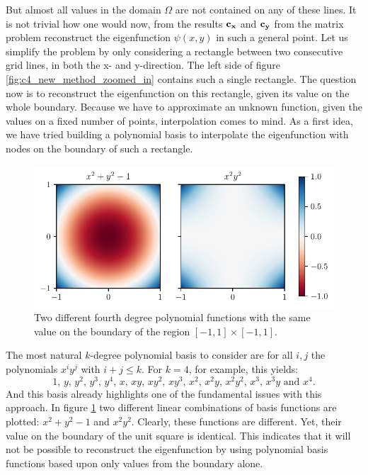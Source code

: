 But almost all values in the domain $\Omega$ are not contained on any of these lines. It is not trivial how one would now, from the results $\vb{c_x}$ and $\vb{c_y}$ from the matrix problem reconstruct the eigenfunction $\psi(x, y)$ in such a general point. Let us simplify the problem by only considering a rectangle between two consecutive grid lines, in both the x- and y-direction. The left side of figure \ref{fig:c4_new_method_zoomed_in} contains such a single rectangle. The question now is to reconstruct the eigenfunction on this rectangle, given its value on the whole boundary. Because we have to approximate an unknown function, given the values on a fixed number of points, interpolation comes to mind. As a first idea, we have tried building a polynomial basis to interpolate the eigenfunction with nodes on the boundary of such a rectangle.

\begin{figure}
    \begin{center}
        \includegraphics*[width=1\textwidth]{img/chapter4/nm_interpolation.pdf}
    \end{center}
    \caption{Two different fourth degree polynomial functions with the same value on the boundary of the region $[-1, 1] \times [-1, 1]$.}\label{fig:c4_interpolation_boundary issue}
\end{figure}

The most natural $k$-degree polynomial basis to consider are for all $i, j$ the polynomials $x^i y^j$ with $i + j \leq k$. For $k = 4$, for example, this yields:
$$
    1\text{, } y\text{, } y^2\text{, } y^3\text{, } y^4\text{, } x\text{, } x y\text{, } x y^2\text{, } x y^3\text{, } x^2\text{, } x^2 y\text{, } x^2 y^2\text{, } x^3\text{, } x^3 y\text{ and } x^4\text{.}
$$
And this basis already highlights one of the fundamental issues with this approach. In figure \ref{fig:c4_interpolation_boundary issue} two different linear combinations of basis functions are plotted: $x^2 + y^2 -1$ and $x^2y^2$. Clearly, these functions are different. Yet, their value on the boundary of the unit square is identical. This indicates that it will not be possible to reconstruct the eigenfunction by using polynomial basis functions based upon only values from the boundary alone.

